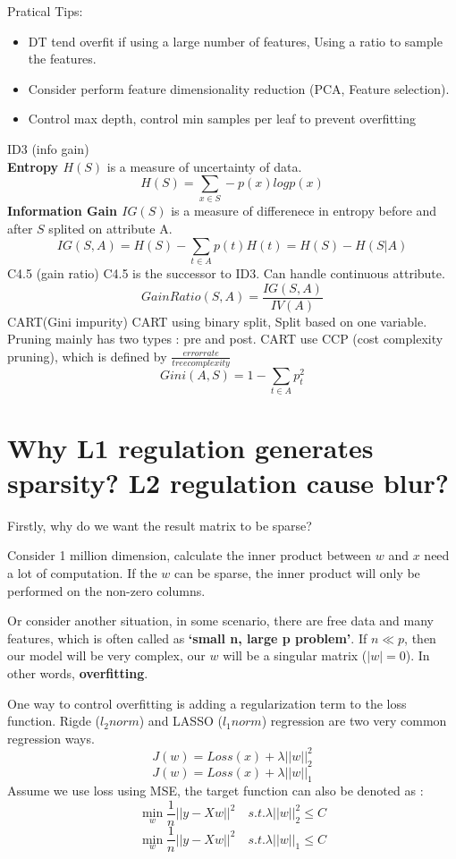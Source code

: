 \documentclass{article}
\begin{document}
Pratical Tips:
\begin{itemize}
\item DT tend overfit if using a large number of features, Using a ratio to sample the features.
\item Consider perform feature dimensionality reduction (PCA, Feature selection).
\item Control max depth, control min samples per leaf to prevent overfitting
\end{itemize}
ID3 (info gain) \\
\textbf{Entropy $H(S)$} is a measure of uncertainty of data. 
$$H(S)=\sum_{x \in S}-p(x)logp(x)$$
\textbf{Information Gain $IG(S)$} is a measure of differenece in entropy before and after $S$ splited on attribute A.
$$IG(S,A)=H(S)-\sum_{t \in A}p(t)H(t)=H(S)-H(S|A)$$
C4.5 (gain ratio)
C4.5 is the successor to ID3. Can handle continuous attribute.
$$GainRatio(S,A)=\frac{IG(S,A)}{IV(A)}$$
CART(Gini impurity)
CART using binary split, Split based on one variable. Pruning mainly has two types : pre and post. CART use CCP (cost complexity pruning), which is defined by $\frac{error rate}{tree complexity}$
$$Gini(A,S)=1-\sum_{t \in A} p_{t}^{2}$$


\section{Why L1 regulation generates sparsity? L2 regulation cause blur?}

Firstly, why do we want the result matrix to be sparse?

Consider 1 million dimension, calculate the inner product between $w$ and $x$ need a lot of computation. If the $w$ can be sparse, the inner product will only be performed on the non-zero columns.

Or consider another situation, in some scenario, there are free data and many features, which is often called as \textbf{`small n, large p problem'}. If $n \ll p $, then our model will be very complex, our $w$ will be a singular matrix ($|w|=0$). In other words, \textbf{overfitting}.

One way to control overfitting is adding a regularization term to the loss function. Rigde  ($l_{2} norm$) and LASSO ($l_{1} norm$) regression are two very common regression ways.
$$J(w)=Loss(x)+\lambda ||w||_{2}^{2}$$
$$J(w)=Loss(x)+\lambda ||w||_{1}$$
Assume we use loss using MSE, the target function can also be denoted as :
$$ \mathop{\min}_{w} \frac{1}{n}||y-Xw||^{2} \quad  s.t. \lambda ||w||_{2}^{2} \leq C $$
$$ \mathop{\min}_{w} \frac{1}{n}||y-Xw||^{2} \quad  s.t. \lambda ||w||_{1} \leq C $$
\end{document}
